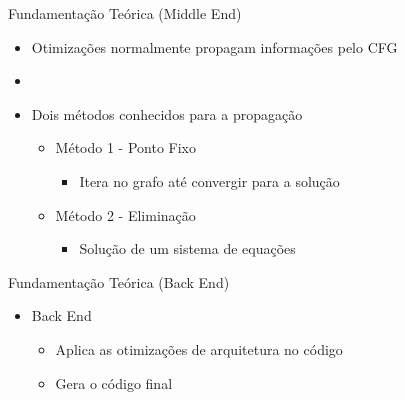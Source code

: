 \begin{frame}{Fundamentação Teórica (Middle End)}
  \begin{itemize}
      \item Otimizações normalmente propagam informações pelo CFG
      \item[]
      \item Dois métodos conhecidos para a propagação
      \begin{itemize}
          \item Método 1 - Ponto Fixo
              \begin{itemize}
                  \item Itera no grafo até convergir para a solução
              \end{itemize}
          \item Método 2 - Eliminação
              \begin{itemize}
                  \item Solução de um sistema de equações
              \end{itemize}
      \end{itemize}
  \end{itemize}
\end{frame}

\begin{frame}{Fundamentação Teórica (Back End)}
  \begin{itemize}
    \item Back End
    \begin{itemize}
        \item Aplica as otimizações {\color{blue}{dependentes}} de arquitetura no código
        \item Gera o código final
    \end{itemize}
  \end{itemize}
\end{frame}

